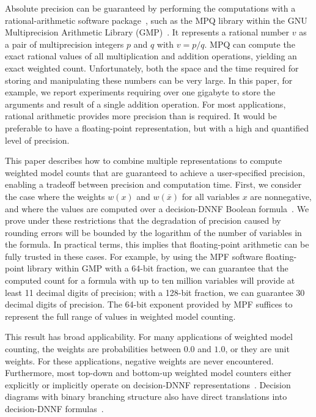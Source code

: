 \documentclass[
hf
]{ceurart}
\newcommand{\obar}[1]{\overline{#1}}
\begin{document}
Absolute precision can be guaranteed by performing the
computations with a rational-arithmetic software package~\cite{knuth:rational:1981}, such as the
MPQ library within the GNU Multiprecision Arithmetic
Library (GMP)~\cite{granlund:gmp:2015}.  It represents a rational number $v$ as a
pair of multiprecision integers $p$ and $q$ with $v = p/q$.
MPQ
can compute the exact rational values of all multiplication and
addition operations, yielding an exact weighted count.  Unfortunately,
both the space and the time required for storing and manipulating these numbers can be very
large.
In this paper, for example, we report experiments requiring over one gigabyte
to store the arguments and result of a single addition operation.
For most applications, rational arithmetic provides more precision than is required.
It would be preferable to have a floating-point
representation, but with a high and quantified level of precision.

This paper describes how to combine multiple representations to compute
weighted model counts that are guaranteed to achieve a user-specified
precision, enabling a tradeoff between precision and computation time.
First, we consider the case where the weights $w(x)$ and $w(\obar{x})$
for all variables $x$ are nonnegative, and where the values are
computed over a decision-DNNF Boolean
formula~\cite{beame:uai:2013,huang:jair:2007}.  We prove under these
restrictions that the degradation of precision caused by rounding
errors will be bounded by the logarithm of the number of variables in
the formula.  In practical terms, this implies that floating-point
arithmetic can be fully trusted in these cases.  For example, by using
the MPF software floating-point library within GMP with a 64-bit
fraction, we can guarantee that the computed count for a formula with
up to ten million variables will provide at least 11 decimal digits of
precision; with a 128-bit fraction, we can guarantee 30 decimal digits of precision.
The 64-bit exponent provided by MPF suffices to represent
the full range of values in weighted model counting.

This result has broad applicability.
For many applications
of weighted model counting, the weights are probabilities between
$0.0$ and $1.0$, or they are unit weights.  For these applications,  negative weights are never encountered.
Furthermore, most top-down and bottom-up weighted model
counters either explicitly or implicitly operate on decision-DNNF
representations~\cite{beame:uai:2013}.  
Decision diagrams with binary branching structure
also have direct translations into decision-DNNF formulas~\cite{huang:jair:2007,oztok:cp:2014}.
\end{document}
